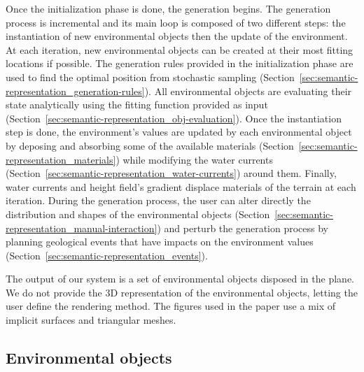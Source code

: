 Once the initialization phase is done, the generation begins. The generation process is incremental and its main loop is composed of two different steps: the instantiation of new environmental objects then the update of the environment.
At each iteration, new environmental objects can be created at their most fitting locations if possible. The generation rules provided in the initialization phase are used to find the optimal position from stochastic sampling (Section~\ref{sec:semantic-representation_generation-rules}). 
All environmental objects are evaluating their state analytically using the fitting function provided as input (Section~\ref{sec:semantic-representation_obj-evaluation}).
Once the instantiation step is done, the environment's values are updated by each environmental object by deposing and absorbing some of the available materials (Section~\ref{sec:semantic-representation_materials}) while modifying the water currents (Section~\ref{sec:semantic-representation_water-currents}) around them. Finally, water currents and height field's gradient displace materials of the terrain at each iteration.
During the generation process, the user can alter directly the distribution and shapes of the environmental objects (Section~\ref{sec:semantic-representation_manual-interaction}) and perturb the generation process by planning geological events that have impacts on the environment values (Section~\ref{sec:semantic-representation_events}).

The output of our system is a set of environmental objects disposed in the plane. We do not provide the 3D representation of the environmental objects, letting the user define the rendering method. The figures used in the paper use a mix of implicit surfaces and triangular meshes.



\subsection{Environmental objects}
\label{sec:semantic-representation_environmental-objects}

